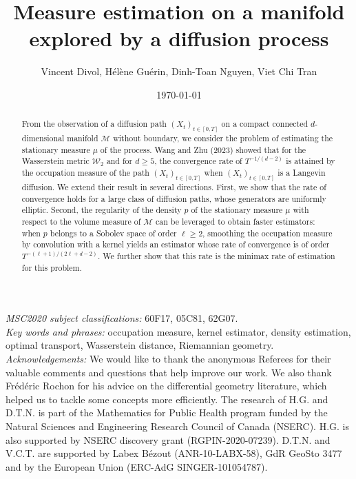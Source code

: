 \documentclass[10pt,a4paper]{article}
\newcommand\cM{\mathcal{M}}
\newcommand\W{\mathcal{W}}
\renewcommand{\geq}{\geqslant}
\begin{document}
		\title{Measure estimation on a manifold explored by a diffusion process}
	\author{Vincent Divol, Hélène Guérin, Dinh-Toan Nguyen, Viet Chi Tran}

	
	\date{\today}
	
	\maketitle








\begin{abstract}
From the observation of a diffusion path $(X_t)_{t\in [0,T]}$ on a compact connected  $d$-dimensional manifold $\cM$ without boundary, we consider the problem of estimating the stationary measure $\mu$ of the process. Wang and Zhu (2023) showed that for the Wasserstein metric $\W_2$ and for $d\ge 5$, the convergence rate of $T^{-1/(d-2)}$ is attained by the occupation measure of the path  $(X_t)_{t\in [0,T]}$  when $(X_t)_{t\in [0,T]}$ is a Langevin diffusion. We extend their result in several directions. First, we show that the rate of convergence holds for a large class of diffusion paths, whose generators are uniformly elliptic. Second, the regularity of the density $p$ of the stationary measure $\mu$ with respect to the volume measure of $\cM$ can be leveraged to obtain faster estimators: when $p$ belongs to a Sobolev space of order $\ell\geq 2$, smoothing the occupation measure by convolution with a kernel yields an estimator whose rate of convergence is of order $T^{-(\ell+1)/(2\ell+d-2)}$. We further show that this rate is the minimax rate of estimation for this problem.
\end{abstract}

\noindent \textit{MSC2020 subject classifications:} 60F17, 05C81, 62G07. \\

\noindent \textit{Key words and phrases:} occupation measure, kernel estimator, density estimation, optimal transport, Wasserstein distance, Riemannian geometry.\\

\noindent \textit{Acknowledgements:} We would like to thank the anonymous Referees for their valuable comments and questions that help improve our work. We also thank Frédéric Rochon for his advice on the differential geometry literature, which helped us to tackle some concepts more efficiently.
The research of H.G. and D.T.N. is part of the Mathematics for Public Health program funded by the Natural Sciences and Engineering Research Council of Canada (NSERC). H.G. is also supported by NSERC discovery grant (RGPIN-2020-07239). D.T.N. and V.C.T. are supported by Labex B\'ezout (ANR-10-LABX-58), GdR GeoSto 3477 and by the European Union (ERC-AdG SINGER-101054787).
\end{document}
